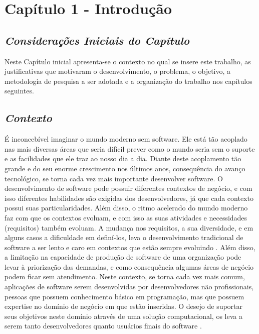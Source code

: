 \chapter[Capítulo 1 - Introdução]{Capítulo 1 - Introdução}

\section{\textit{Considerações Iniciais do Capítulo}}

Neste Capítulo inicial apresenta-se o contexto no qual se insere este trabalho, as
justificativas que motivaram o desenvolvimento, o problema, o objetivo, a
metodologia de pesquisa a ser adotada e a organização do trabalho nos capítulos seguintes.

\section{\textit{Contexto}}

É inconcebível imaginar o mundo moderno sem software. Ele está tão acoplado nas mais diversas áreas que seria difícil prever como o mundo seria sem o suporte e as facilidades que ele traz ao nosso dia a dia. Diante deste acoplamento tão grande e do seu enorme crescimento nos últimos anos, consequência do avanço tecnológico, se torna cada vez mais importante desenvolver software. O desenvolvimento de software pode possuir diferentes contextos de negócio, e com isso diferentes habilidades são exigidas dos desenvolvedores, já que cada contexto possui suas particularidades. Além disso, o ritmo acelerado do mundo moderno faz com que os contextos evoluam, e com isso as suas atividades e necessidades (requisitos) também evoluam. A mudança nos requisitos, a sua diversidade, e em alguns casos a dificuldade em definí-los, leva o desenvolvimento tradicional de software a ser lento e caro em contextos que estão sempre evoluindo \cite{lieberman2006}. Além disso, a limitação na capacidade de produção de software de uma organização pode levar à priorização das demandas, e como consequência algumas áreas de negócio podem ficar sem atendimento. Neste contexto, se torna cada vez mais comum, aplicações de software serem desenvolvidas por desenvolvedores não profissionais, pessoas que possuem conhecimento básico em programação, mas que possuem expertise no domínio de negócio em que estão inseridas. O desejo de suportar seus objetivos neste domínio através de uma solução computacional, os leva a serem tanto desenvolvedores quanto usuários finais do software \cite{lieberman2006}. 

